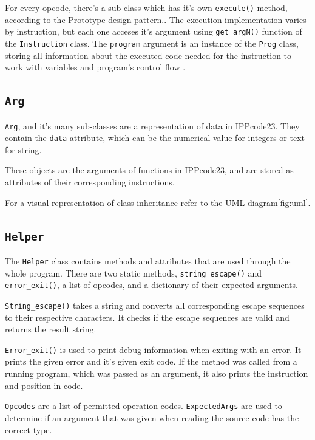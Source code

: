 \documentclass[11pt,a4paper]{article}
\begin{document}
For every opcode, there's a sub-class which has it's own \verb|execute()| method, according to the Prototype
design pattern.\cite{prototype}. The execution implementation varies by instruction, but each one acceses
it's argument using \verb|get_argN()| function of the \verb|Instruction| class. The \verb|program| argument is
an instance of the \verb|Prog| class, storing all information about the executed code needed for the 
instruction to work with variables and program's control flow . 

 
\subsection{\texttt{Arg}}

\verb|Arg|, and it's many sub-classes are a representation of data in IPPcode23. They contain the \verb|data|
attribute, which can be the numerical value for integers or text for string.

These objects are the arguments of functions in IPPcode23, and are stored as attributes of their corresponding
instructions.

For a visual representation of class inheritance refer to the UML diagram\ref{fig:uml}.


\subsection{\texttt{Helper}}

The \verb|Helper| class contains methods and attributes that are used through the whole program. There are
two static methods, \verb|string_escape()| and \verb|error_exit()|, a list of opcodes, and a dictionary of 
their expected arguments.

\verb|String_escape()| takes a string and converts all corresponding escape sequences to their respective
characters. It checks if the escape sequences are valid and returns the result string.

\verb|Error_exit()| is used to print debug information when exiting with an error. It prints the given
error and it's given exit code. If the method was called from a running program, which was passed as an
argument, it also prints the instruction and position in code.

\verb|Opcodes| are a list of permitted operation codes. \verb|ExpectedArgs| are used to determine if an
argument that was given when reading the source code has the correct type.

\vspace{\fill}
\end{document}
